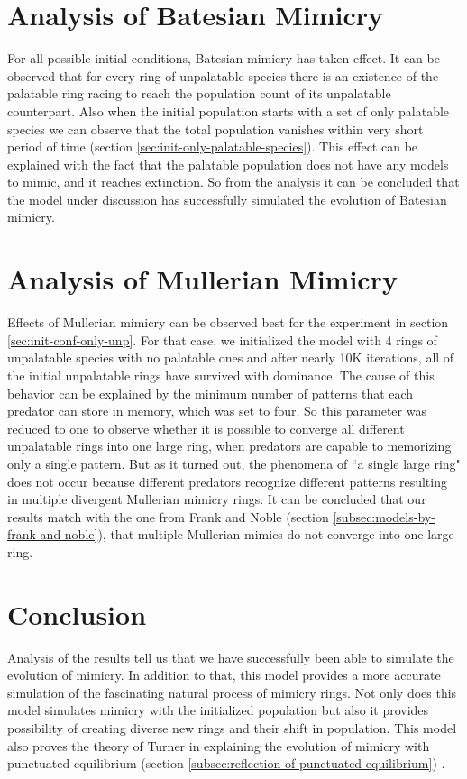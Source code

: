 \section{Analysis of Batesian Mimicry}
\label{sec:result-batesian-mimicry}
For all possible initial conditions, Batesian mimicry has taken effect. It can be observed that for every ring of unpalatable species there is an existence of the palatable ring racing to reach the population count of its unpalatable counterpart. Also when the initial population starts with a set of only palatable species we can observe that the total population vanishes within very short period of time (section \ref{sec:init-only-palatable-species}). This effect can be explained with the fact that the palatable population does not have any models to mimic, and it reaches extinction. So from the analysis it can be concluded that the model under discussion has successfully simulated the evolution of Batesian mimicry.

\section{Analysis of Mullerian Mimicry}
\label{sec:result-mullerian-mimicry}
Effects of Mullerian mimicry can be observed best for the experiment in section \ref{sec:init-conf-only-unp}. For that case, we initialized the model with 4 rings of unpalatable species with no palatable ones and after nearly 10K iterations, all of the initial unpalatable rings have survived with dominance. The cause of this behavior can be explained by the minimum number of patterns that each predator can store in memory, which was set to four. So this parameter was reduced to one to observe whether it is possible to converge all different unpalatable rings into one large ring, when predators are capable to memorizing only a single pattern. But as it turned out, the phenomena of ``a single large ring" does not occur because different predators recognize different patterns resulting in multiple divergent Mullerian mimicry rings. It can be concluded that our results match with the one from Frank and Noble (section \ref{subsec:models-by-frank-and-noble}), that multiple Mullerian mimics do not converge into one large ring.

\section{Conclusion}
\label{sec:result-conclusion}
Analysis of the results tell us that we have successfully been able to simulate the evolution of mimicry. In addition to that, this model provides a more accurate simulation of the fascinating natural process of mimicry rings. Not only does this model simulates mimicry with the initialized population but also it provides possibility of creating diverse new rings and their shift in population. This model also proves the theory of Turner in explaining the evolution of mimicry with punctuated equilibrium (section \ref{subsec:reflection-of-punctuated-equilibrium}) \cite{turner1988}.